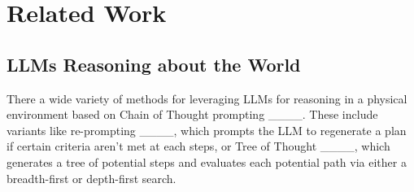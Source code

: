 \section{Related Work}

\subsection{LLMs Reasoning about the World}
There a wide variety of methods for leveraging LLMs for reasoning in a physical environment based on Chain of Thought prompting ____. These include variants like re-prompting ____, which prompts the LLM to regenerate a plan if certain criteria aren't met at each steps, or Tree of Thought ____, which generates a tree of potential steps and evaluates each potential path via either a breadth-first or depth-first search. 

